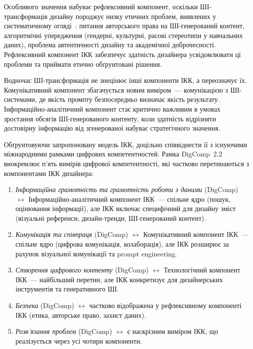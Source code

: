 Особливого значення набуває рефлексивний компонент, оскільки ШІ-трансформація дизайну породжує низку етичних проблем, виявлених у систематичному огляді~\cite{Musiienko2026ScopingReview}: питання авторського права на ШІ-генерований контент, алгоритмічні упередження (гендерні, культурні, расові стереотипи у навчальних даних), проблема автентичності дизайну та академічної доброчесності. Рефлексивний компонент ІКК забезпечує здатність дизайнера усвідомлювати ці проблеми та приймати етично обґрунтовані рішення.

Водночас ШІ-трансформація не знецінює інші компоненти ІКК, а переозначує їх. Комунікативний компонент збагачується новим виміром~--- комунікацією з ШІ-системами, де якість промпту безпосередньо визначає якість результату. Інформаційно-аналітичний компонент стає критично важливим в умовах зростання обсягів ШІ-генерованого контенту, коли здатність відрізняти достовірну інформацію від згенерованої набуває стратегічного значення.


Обґрунтовуючи запропоновану модель ІКК, доцільно співвіднести її з існуючими міжнародними рамками цифрових компетентностей. Рамка DigComp~2.2~\cite{Vuorikari2022DigComp} виокремлює п'ять вимірів цифрової компетентності, які частково перетинаються з компонентами ІКК дизайнера:

\begin{enumerate}
    \item \textit{Інформаційна грамотність та грамотність роботи з даними} (DigComp) $\leftrightarrow$ Інформаційно-аналітичний компонент ІКК~--- спільне ядро (пошук, оцінювання інформації), але ІКК включає специфічний для дизайну зміст (візуальні референси, дизайн-тренди, ШІ-генерований контент).
    \item \textit{Комунікація та співпраця} (DigComp) $\leftrightarrow$ Комунікативний компонент ІКК~--- спільне ядро (цифрова комунікація, колаборація), але ІКК розширює за рахунок візуальної комунікації та prompt engineering.
    \item \textit{Створення цифрового контенту} (DigComp) $\leftrightarrow$ Технологічний компонент ІКК~--- найбільший перетин, але ІКК конкретизує для дизайнерських інструментів та генеративного ШІ.
    \item \textit{Безпека} (DigComp) $\leftrightarrow$ частково відображена у рефлексивному компоненті ІКК (етика, авторське право, захист даних).
    \item \textit{Розв'язання проблем} (DigComp) $\leftrightarrow$ є наскрізним виміром ІКК, що реалізується через усі чотири компоненти.
\end{enumerate}

